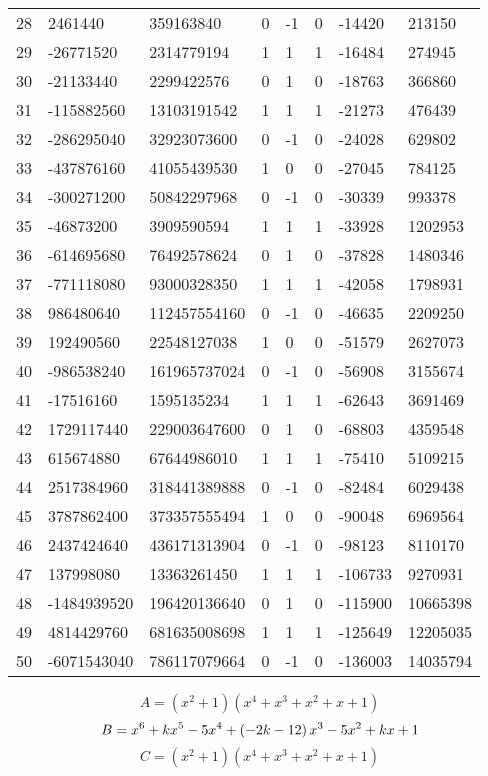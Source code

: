 \documentclass{amsart}
\begin{document}
\begin{longtable}{|l|l|l|lllll|}
28&2461440&359163840&0&-1&0&-14420&213150\\
29&-26771520&2314779194&1&1&1&-16484&274945\\
30&-21133440&2299422576&0&1&0&-18763&366860\\
31&-115882560&13103191542&1&1&1&-21273&476439\\
32&-286295040&32923073600&0&-1&0&-24028&629802\\
33&-437876160&41055439530&1&0&0&-27045&784125\\
34&-300271200&50842297968&0&-1&0&-30339&993378\\
35&-46873200&3909590594&1&1&1&-33928&1202953\\
36&-614695680&76492578624&0&1&0&-37828&1480346\\
37&-771118080&93000328350&1&1&1&-42058&1798931\\
38&986480640&112457554160&0&-1&0&-46635&2209250\\
39&192490560&22548127038&1&0&0&-51579&2627073\\
40&-986538240&161965737024&0&-1&0&-56908&3155674\\
41&-17516160&1595135234&1&1&1&-62643&3691469\\
42&1729117440&229003647600&0&1&0&-68803&4359548\\
43&615674880&67644986010&1&1&1&-75410&5109215\\
44&2517384960&318441389888&0&-1&0&-82484&6029438\\
45&3787862400&373357555494&1&0&0&-90048&6969564\\
46&2437424640&436171313904&0&-1&0&-98123&8110170\\
47&137998080&13363261450&1&1&1&-106733&9270931\\
48&-1484939520&196420136640&0&1&0&-115900&10665398\\
49&4814429760&681635008698&1&1&1&-125649&12205035\\
50&-6071543040&786117079664&0&-1&0&-136003&14035794\\
\hline
\end{longtable}
$$A=(x^2
 + 1)(x^4
 + x^3
 + x^2
 + x
 + 1)$$
$$B=x^6
 + k\*x^5
 - 5\*x^4
 + \left(-2\*k
 - 12\right) \*x^3
 - 5\*x^2
 + k\*x
 + 1$$
$$C=(x^2
 + 1)(x^4
 + x^3
 + x^2
 + x
 + 1)$$
\end{document}
